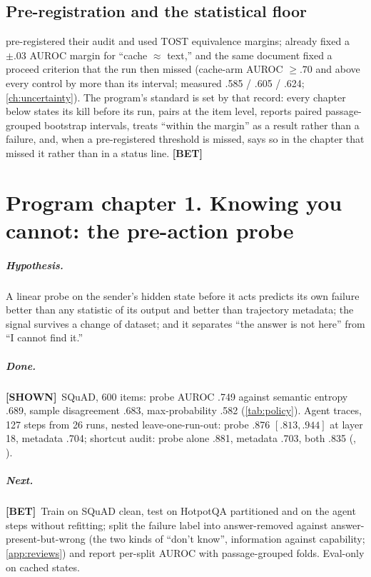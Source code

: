 \documentclass[11pt,a4paper]{report}
\newcommand{\SHOWN}{\textcolor{shownc}{\textbf{\scriptsize[SHOWN]}}}
\newcommand{\BET}{\textcolor{betc}{\textbf{\scriptsize[BET]}}}
\newcommand{\mbet}{\marginnote{\BET}}
\begin{document}
\section{Pre-registration and the statistical floor}

\citet{2608.04893} pre-registered their audit and used TOST equivalence margins;  already fixed a $\pm .03$ AUROC margin for ``cache $\approx$ text,'' and the same document fixed a proceed criterion that the run then missed (cache-arm AUROC $\ge .70$ and above every control by more than its interval; measured .585 / .605 / .624; \cref{ch:uncertainty}). The program's standard is set by that record: every chapter below states its kill before its run, pairs at the item level, reports paired passage-grouped bootstrap intervals, treats ``within the margin'' as a result rather than a failure, and, when a pre-registered threshold is missed, says so in the chapter that missed it rather than in a status line. \BET

\chapter{Program chapter 1. Knowing you cannot: the pre-action probe}
\label{ch:p-probe}

\paragraph{Hypothesis.} \mbet A linear probe on the sender's hidden state before it acts predicts its own failure better than any statistic of its output and better than trajectory metadata; the signal survives a change of dataset; and it separates ``the answer is not here'' from ``I cannot find it.''

\paragraph{Done.} \SHOWN\ SQuAD, 600 items: probe AUROC .749 against semantic entropy .689, sample disagreement .683, max-probability .582 (\cref{tab:policy}). Agent traces, 127 steps from 26 runs, nested leave-one-run-out: probe .876 $[.813, .944]$ at layer 18, metadata .704; shortcut audit: probe alone .881, metadata .703, both .835 (, ).

\paragraph{Next.} \BET\ Train on SQuAD clean, test on HotpotQA partitioned and on the agent steps without refitting; split the failure label into answer-removed against answer-present-but-wrong (the two kinds of ``don't know'', information against capability; \cref{app:reviews}) and report per-split AUROC with passage-grouped folds. Eval-only on cached states.
\end{document}
